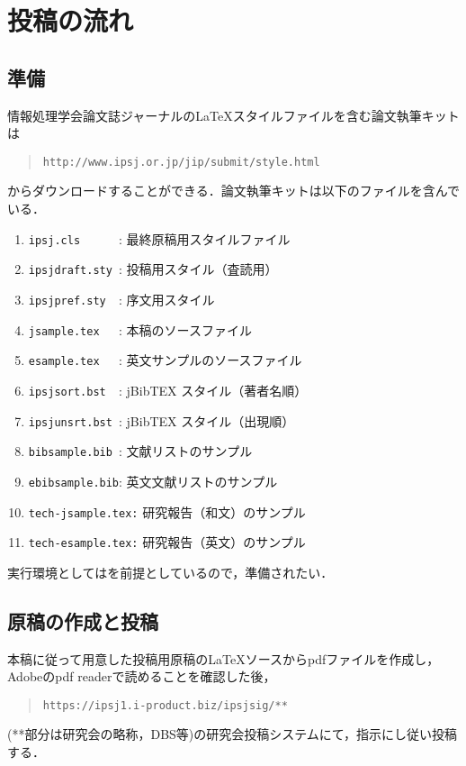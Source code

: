 \documentclass[submit,techrep,noauthor]{ipsj}
\def\|{\verb|}
\begin{document}
%2
\section{投稿の流れ}


%2.1
\subsection{準備}

情報処理学会論文誌ジャーナルの\LaTeX スタイルファイルを含む論文執筆キットは
\begin{quote}
\small
\|http://www.ipsj.or.jp/jip/submit/style.html|
\end{quote}
からダウンロードすることができる．論文執筆キットは以下のファイルを含んで
いる．
\begin{enumerate}
\item \|ipsj.cls      |: 最終原稿用スタイルファイル
\item \|ipsjdraft.sty |: 投稿用スタイル（査読用）
\item \|ipsjpref.sty  |: 序文用スタイル
\item \|jsample.tex   |: 本稿のソースファイル
\item \|esample.tex   |: 英文サンプルのソースファイル
\item \|ipsjsort.bst  |: jBibTEX スタイル（著者名順）
\item \|ipsjunsrt.bst |: jBibTEX スタイル（出現順）
\item \|bibsample.bib |: 文献リストのサンプル
\item \|ebibsample.bib|: 英文文献リストのサンプル
\item \|tech-jsample.tex:| 研究報告（和文）のサンプル
\item \|tech-esample.tex:| 研究報告（英文）のサンプル
\end{enumerate}
実行環境としては\LaTeXe を前提としているので，準備されたい．







\subsection{原稿の作成と投稿}

本稿に従って用意した投稿用原稿の\LaTeX ソースからpdfファイルを作成し，
Adobeのpdf readerで読めることを確認した後，
\begin{quote}
\small
\|https://ipsj1.i-product.biz/ipsjsig/**|
\end{quote}
(**部分は研究会の略称，DBS等)の研究会投稿システムにて，指示にし従い投稿する．
\end{document}
